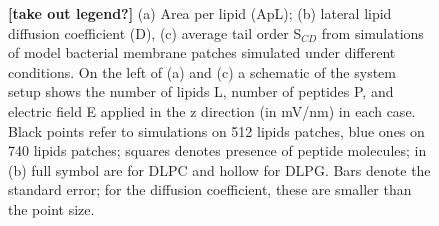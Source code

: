 \begin{figure}
\centering
\begin{minipage}{9.42cm}
\centering
{} 
\end{minipage}
\begin{minipage}{5.7cm}
\centering
{}
\end{minipage}
\begin{minipage}{5.7cm}
\centering
{} 
\end{minipage}
\caption{\textbf{[take out legend?]} (a) Area per lipid (ApL); (b) lateral lipid diffusion coefficient (D), (c) average tail order S$_{CD}$ from simulations of model bacterial membrane patches simulated under different conditions. On the left of (a) and (c) a schematic of the system setup shows the number of lipids L, number of peptides P, and electric field E applied in the z direction (in mV/nm) in each case. Black points refer to simulations on 512 lipids patches, blue ones on 740 lipids patches; squares denotes presence of peptide molecules; in (b) full symbol are for DLPC and hollow for DLPG. Bars denote the standard error; for the diffusion coefficient, these are smaller than the point size.}
\label{fig:lipids_ApL_D}
\end{figure}

